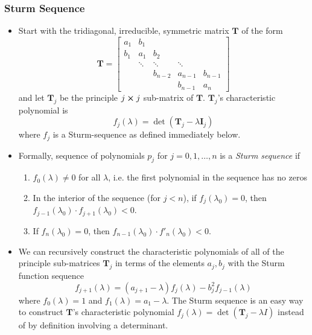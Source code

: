 \documentclass[11pt, a4paper]{article}
\newcommand{\mat}[1]{\mathbf{#1}} %
\begin{document}
\subsubsection{Sturm Sequence}
\begin{itemize}

	\item Start with the tridiagonal, irreducible, symmetric matrix $ \mat{T} $ of the form
	\[
		\mat{T} = \begin{bmatrix}
			a_1 & b_1 &  &  &\\
			b_{1} & a_1 & b_2 &  &\\
			& \ddots & \ddots & \ddots &\\
			& & b_{n-2} & a_{n-1} & b_{n-1}\\
			& & & b_{n-1} & a_{n}
		\end{bmatrix}
	\]
	and let $ \mat{T}_j $ be the principle $ j \cross j $ sub-matrix of $ \mat{T} $. $  \mat{T}_j $'s characteristic polynomial is
	\begin{equation*}
		f_{j}(\lambda) = \det(\mat{T}_j - \lambda \mat{I}_{j}) 
	\end{equation*}
	where $ f_{j} $ is a Sturm-sequence as defined immediately below.
	
	\item Formally, sequence of polynomials $ p_j $ for $ j = 0, 1, \dots, n $ is a \textit{Sturm sequence} if
	\begin{enumerate}
		\item $ f_{0}(\lambda) \neq 0 $ for all $ \lambda $, i.e. the first polynomial in the sequence has no zeros
		\item In the interior of the sequence (for $ j < n $), if $ f_{j}(\lambda_0) = 0$, then  $ f_{j-1}(\lambda_0) \cdot f_{j+1}(\lambda_0) < 0$.
		
		\item If $ f_{n}(\lambda_0) = 0 $, then $ f_{n-1}(\lambda_0) \cdot f'_{n}(\lambda_0) < 0$.
	\end{enumerate}
	
	\item We can recursively construct the characteristic polynomials of all of the principle sub-matrices $ \mat{T}_{j} $ in terms of the elements $ a_{j}, b_{j} $ with the Sturm function sequence
	\begin{equation*}
		f_{j+1}(\lambda) = (a_{j+1} - \lambda)f_{j}(\lambda) - b_{j}^2f_{j-1}(\lambda)
	\end{equation*}
	where $ f_{0}(\lambda) = 1 $ and $ f_{1}(\lambda) = a_1 - \lambda $. The Sturm sequence is an easy way to construct $ \mat{T} $'s characteristic polynomial $ f_{j}(\lambda) = \det(\mat{T}_j - \lambda I)  $ instead of by definition involving a determinant.
	

\end{itemize}
\end{document}
